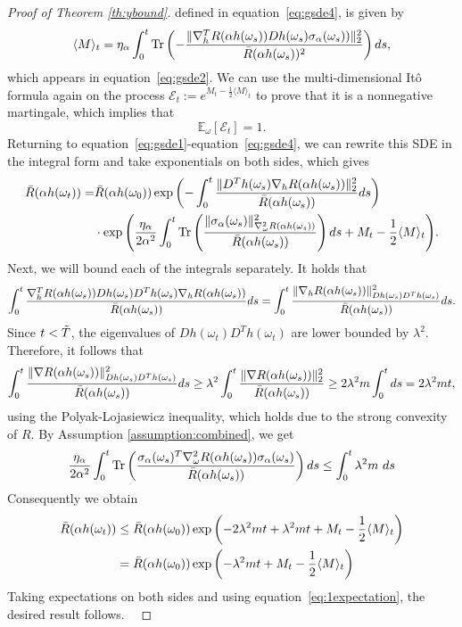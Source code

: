 \documentclass[10pt]{article} %
\def\eqref#1{equation~\ref{#1}}
\newcommand{\bE}{\mathbb{E}}
\newcommand{\cE}{\mathcal{E}}
\begin{document}
\begin{proof}[Proof of Theorem \ref{th:ybound}]
    defined in \eqref{eq:gsde4}, is given by 
    $$\langle M\rangle_t=\eta_\alpha \int_0^t \mathrm{Tr}\left(-\frac{\|\nabla_h^TR(\alpha h(\omega_s))Dh(\omega_s)\sigma_\alpha(\omega_s))\|_2^2}{\Bar{R}(\alpha h(\omega_s))^2}\right)ds,$$
    which appears in \eqref{eq:gsde2}. We can use the multi-dimensional Itô formula again on the process $\cE_t:=e^{M_t-\frac{1}{2}\langle M\rangle_t}$ to prove that it is a nonnegative martingale, which implies that 
    \begin{equation}\label{eq:1expectation}
        \bE_\omega[\cE_t]=1.
    \end{equation}
    Returning to \eqref{eq:gsde1}-\eqref{eq:gsde4}, we can rewrite this SDE in the integral form and take exponentials on both sides, which gives
    \begin{align*}
        \Bar{R}(\alpha h(\omega_t))=&\Bar{R}(\alpha h(\omega_0))\exp{\left(-\int_0^t\frac{\|D^Th(\omega_s)\nabla_h R(\alpha h(\omega_s))\|_2^2}{\Bar{R}(\alpha h(\omega_s))}ds\right)}\\
        &\cdot\exp{\left(\frac{\eta_\alpha}{2\alpha^2}\int_0^t\mathrm{Tr}\left(\frac{\|\sigma_\alpha(\omega_s)\|_{\nabla^2_\omega R(\alpha h(\omega_s))}^2}{\Bar{R}(\alpha h(\omega_s))}\right)ds+M_t-\frac{1}{2}\langle M\rangle_t\right)}.
    \end{align*}    
    Next, we will bound each of the integrals separately. It holds that
    $$
        \int_0^t\frac{\nabla_h^TR(\alpha h(\omega_s)) Dh(\omega_s)D^Th(\omega_s)\nabla_h R(\alpha h(\omega_s))}{\Bar{R}(\alpha h(\omega_s))}ds=\int_0^t \frac{\|\nabla_h R(\alpha h(\omega_s))\|^2_{Dh(\omega_s)D^Th(\omega_s)}}{\Bar{R}(\alpha h(\omega_s))}ds.
    $$
    Since $t<\Tilde{T}$, the eigenvalues of $Dh(\omega_t)D^Th(\omega_t)$ are lower bounded by $\lambda^2$. Therefore, it follows that 
    $$\int_0^t \frac{\|\nabla R(\alpha h(\omega_s))\|^2_{Dh(\omega_s)D^Th(\omega_s)}}{\Bar{R}(\alpha h(\omega_s))}ds\geq \lambda^2 \int_0^t\frac{\|\nabla R(\alpha h(\omega_s))\|^2_2}{\Bar{R}(\alpha h(\omega_s))}\geq 2\lambda^2 m\int_0^t ds = 2\lambda^2 m t,$$
    using the Polyak-Lojasiewicz inequality, which holds due to the strong convexity of $R$.
    By Assumption \ref{assumption:combined}, we get
    \begin{align*}
    \frac{\eta_\alpha}{2\alpha^2}\int_0^t \mathrm{Tr}\left(\frac{\sigma_\alpha(\omega_s)^T\nabla^2_\omega R(\alpha h(\omega_s))\sigma_\alpha(\omega_s)}{\Bar{R}(\alpha h(\omega_s))}\right)ds\leq \int_0^t \lambda^2m\ ds
    \end{align*}
    Consequently we obtain
    \begin{align*}
        \Bar{R}(\alpha h(\omega_t))&\leq \Bar{R}(\alpha h(\omega_0))\exp{\left(-2\lambda^2mt+\lambda^2mt+M_t-\frac{1}{2}\langle M\rangle_t\right)}\\
        &=\Bar{R}(\alpha h(\omega_0))\exp{\left(-\lambda^2mt+M_t-\frac{1}{2}\langle M\rangle_t\right)}
    \end{align*}
    Taking expectations on both sides and using \eqref{eq:1expectation}, the desired result follows.
    \
\end{proof}
\end{document}
